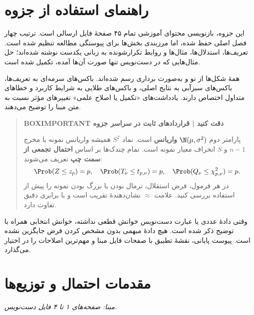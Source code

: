 

\chapter*{راهنمای استفاده از جزوه}

این جزوه، بازنویسی محتوای آموزشی تمام ۴۵ صفحهٔ فایل ارسالی است. ترتیب چهار فصل اصلی حفظ شده، اما مرزبندی بخش‌ها برای پیوستگی مطالعه تنظیم شده است. تعریف‌ها، استدلال‌ها، مثال‌ها و روابط تکرارشونده به زبانی یکدست نوشته شده‌اند؛ حل مثال‌هایی که در دست‌نویس تنها صورت آن‌ها آمده، تکمیل شده است.

همهٔ شکل‌ها از نو و به‌صورت برداری رسم شده‌اند. باکس‌های سرمه‌ای به تعریف‌ها، باکس‌های سبزآبی به نتایج اصلی، و باکس‌های طلایی به شرایط کاربرد و خطاهای متداول اختصاص دارند. یادداشت‌های «تکمیل یا اصلاح علمی» تغییرهای مؤثر نسبت به متن مبنا را توضیح می‌دهند.
\begin{quote}\textbf{BOXIMPORTANT دقت کنید | قراردادهای ثابت در سراسر جزوه}\par 
پارامتر دوم $\N(\mu,\sigma^2)$ \textbf{واریانس} است. نماد $S^2$ همیشه واریانس نمونه با مخرج $n-1$ و $S$ انحراف معیار نمونه است. تمام چندک‌ها بر اساس \textbf{احتمال تجمعی از سمت چپ} تعریف می‌شوند:
\[
\Prob(Z\le z_p)=p,\quad
\Prob(T_\nu\le t_{p,\nu})=p,\quad
\Prob(Q_\nu\le\chi^2_{p,\nu})=p.
\]
در هر فرمول، فرض استقلال، نرمال بودن یا بزرگ بودن نمونه را پیش از استفاده بررسی کنید. علامت $\approx$ نشان‌دهندهٔ تقریب است و با برابری دقیق تفاوت دارد.
\end{quote}
وقتی دادهٔ عددی یا عبارت دست‌نویس خوانش قطعی نداشته، خوانش انتخابی همراه با توضیح ذکر شده است. هیچ دادهٔ مبهمی بدون مشخص کردن فرض جایگزین نشده است. پیوست پایانی، نقشهٔ تطبیق با صفحات فایل مبنا و مهم‌ترین اصلاحات را در اختیار می‌گذارد.


\chapter{مقدمات احتمال و توزیع‌ها}
\textit{مبنا: صفحه‌های ۱ تا ۴ فایل دست‌نویس.}\par 
